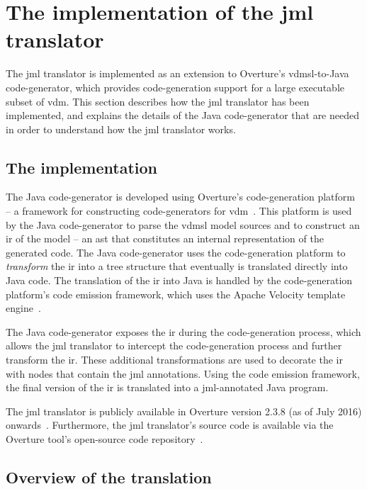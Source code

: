 \section{The implementation of the \ac{jml} translator}
\label{sec:sl2java}

The \ac{jml} translator is implemented as an extension to Overture's
\ac{vdmsl}-to-Java code-generator, which provides code-generation
support for a large executable subset of \ac{vdm}. This section
describes how the \ac{jml} translator has been implemented, and
explains the details of the Java code-generator that are needed in
order to understand how the \ac{jml} translator works.

\subsection{The implementation}

The Java code-generator is developed using Overture's code-generation
platform -- a framework for constructing code-generators for
\ac{vdm}~\cite{Jorgensen&14a}. This platform is used by the Java
code-generator to parse the \ac{vdmsl} model sources and to construct
an \ac{ir} of the model -- an \ac{ast} that constitutes an internal
representation of the generated code. The Java code-generator uses the
code-generation platform to \emph{transform} the \ac{ir} into a tree
structure that eventually is translated directly into Java code. The
translation of the \ac{ir} into Java is handled by the code-generation
platform's code emission framework, which uses the Apache Velocity
template engine~\cite{ApacheVelocity}.

The Java code-generator exposes the \ac{ir} during the code-generation
process, which allows the \ac{jml} translator to intercept the
code-generation process and further transform the \ac{ir}. These
additional transformations are used to decorate the \ac{ir} with nodes
that contain the \ac{jml} annotations. Using the code emission
framework, the final version of the \ac{ir} is translated into a
\ac{jml}-annotated Java program.

The \ac{jml} translator is publicly available in Overture version
2.3.8 (as of July 2016) onwards~\cite{Overture}. Furthermore, the
\ac{jml} translator's source code is available via the Overture tool's
open-source code repository~\cite{OvertureGithub}.

\subsection{Overview of the translation}

